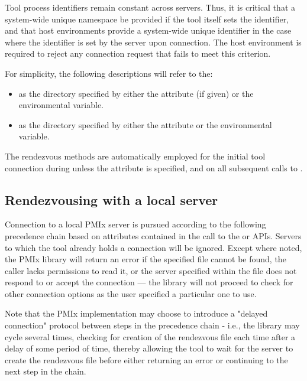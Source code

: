 Tool process identifiers remain constant across servers. Thus, it is critical that a system-wide unique namespace be provided if the tool itself sets the identifier, and that host environments provide a system-wide unique identifier in the case where the identifier is set by the server upon connection. The host environment is required to reject any connection request that fails to meet this criterion.

For simplicity, the following descriptions will refer to the:

\begin{itemize}
    \item {} as the directory specified by either the  attribute (if given) or the  environmental variable.
    \item {} as the directory specified by either the  attribute or the  environmental variable.
\end{itemize}

The rendezvous methods are automatically employed for the initial tool connection during  unless the  attribute is specified, and on all subsequent calls to .

\subsection{Rendezvousing with a local server}

Connection to a local \ac{PMIx} server is pursued according to the following precedence chain based on attributes contained in the call to the  or  \acp{API}. Servers to which the tool already holds a connection will be ignored. Except where noted, the \ac{PMIx} library will return an error if the specified file cannot be found, the caller lacks permissions to read it, or the server specified within the file does not respond to or accept the connection — the library will not proceed to check for other connection options as the user specified a particular one to use.

Note that the \ac{PMIx} implementation may choose to introduce a "delayed connection" protocol between steps in the precedence chain - i.e., the library may cycle several times, checking for creation of the rendezvous file each time after a delay of some period of time, thereby allowing the tool to wait for the server to create the rendezvous file before either returning an error or continuing to the next step in the chain.

